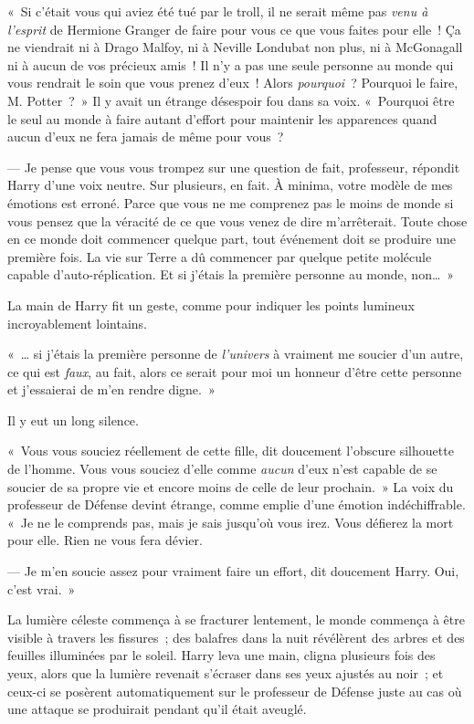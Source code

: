 «~Si c'était vous qui aviez été tué par le troll, il ne serait même pas \emph{venu à l'esprit} de Hermione Granger de faire pour vous ce que vous faites pour elle~!
Ça ne viendrait ni à Drago Malfoy, ni à Neville Londubat non plus, ni à McGonagall ni à aucun de vos précieux amis~!
Il n'y a pas une seule personne au monde qui vous rendrait le soin que vous prenez d'eux~!
Alors \emph{pourquoi}~?
Pourquoi le faire, M. Potter~?~»
Il y avait un étrange désespoir fou dans sa voix.
«~Pourquoi être le seul au monde à faire autant d'effort pour maintenir les apparences quand aucun d'eux ne fera jamais de même pour vous~?

--- Je pense que vous vous trompez sur une question de fait, professeur, répondit Harry d'une voix neutre.
Sur plusieurs, en fait.
À minima, votre modèle de mes émotions est erroné.
Parce que vous ne me comprenez pas le moins de monde si vous pensez que la véracité de ce que vous venez de dire m'arrêterait.
Toute chose en ce monde doit commencer quelque part, tout événement doit se produire une première fois.
La vie sur Terre a dû commencer par quelque petite molécule capable d'auto-réplication.
Et si j'étais la première personne au monde, non…~»

La main de Harry fit un geste, comme pour indiquer les points lumineux incroyablement lointains.

«~… si j'étais la première personne de \emph{l'univers} à vraiment me soucier d'un autre, ce qui est \emph{faux}, au fait, alors ce serait pour moi un honneur d'être cette personne et j'essaierai de m'en rendre digne.~»

Il y eut un long silence.

«~Vous vous souciez réellement de cette fille, dit doucement l'obscure silhouette de l'homme.
Vous vous souciez d'elle comme \emph{aucun} d'eux n'est capable de se soucier de sa propre vie et encore moins de celle de leur prochain.~»
La voix du professeur de Défense devint étrange, comme emplie d'une émotion indéchiffrable.
«~Je ne le comprends pas, mais je sais jusqu'où vous irez.
Vous défierez la mort pour elle.
Rien ne vous fera dévier.

--- Je m'en soucie assez pour vraiment faire un effort, dit doucement Harry.
Oui, c'est vrai.~»

La lumière céleste commença à se fracturer lentement, le monde commença à être visible à travers les fissures~; des balafres dans la nuit révélèrent des arbres et des feuilles illuminées par le soleil.
Harry leva une main, cligna plusieurs fois des yeux, alors que la lumière revenait s'écraser dans ses yeux ajustés au noir~; et ceux-ci se posèrent automatiquement sur le professeur de Défense juste au cas où une attaque se produirait pendant qu'il était aveuglé.

